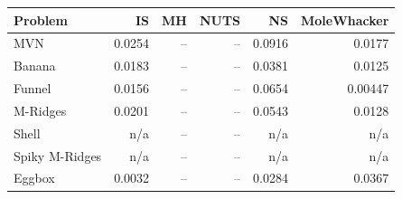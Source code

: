 \begin{tabular}{lrrrrr}
\toprule
Problem & IS & MH & NUTS & NS & MoleWhacker \\
\midrule
MVN & 0.0254 & -- & -- & 0.0916 & 0.0177 \\
Banana & 0.0183 & -- & -- & 0.0381 & 0.0125 \\
Funnel & 0.0156 & -- & -- & 0.0654 & 0.00447 \\
M-Ridges & 0.0201 & -- & -- & 0.0543 & 0.0128 \\
Shell & n/a & -- & -- & n/a & n/a \\
Spiky M-Ridges & n/a & -- & -- & n/a & n/a \\
\midrule
Eggbox & 0.0032 & -- & -- & 0.0284 & 0.0367 \\
\bottomrule
\end{tabular}

